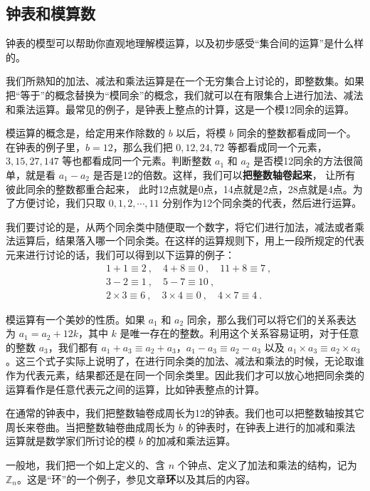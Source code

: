\subsection{钟表和模算数}

钟表的模型可以帮助你直观地理解模运算，以及初步感受“集合间的运算”是什么样的。

我们所熟知的加法、减法和乘法运算是在一个无穷集合上讨论的，即整数集。如果把“等于”的概念替换为“模同余”的概念，我们就可以在有限集合上进行加法、减法和乘法运算。最常见的例子，是钟表上整点的计算，这是一个模12同余的运算。

模运算的概念是，给定用来作除数的 $b$ 以后，将模 $b$ 同余的整数都看成同一个。在钟表的例子里，$b=12$，那么我们把 $0,12,24,72$ 等都看成同一个元素，$3,15,27,147$ 等也都看成同一个元素。判断整数 $a_1$ 和 $a_2$ 是否模12同余的方法很简单，就是看 $a_1-a_2$ 是否是12的倍数。这样，我们可以\textbf{把整数轴卷起来}， 让所有彼此同余的整数都重合起来， 此时12点就是0点，14点就是2点，28点就是4点。为了方便讨论，我们只取 $0,1,2,\cdots,11$ 分别作为12个同余类的代表，然后进行运算。

我们要讨论的是，从两个同余类中随便取一个数字，将它们进行加法，减法或者乘法运算后，结果落入哪一个同余类。在这样的运算规则下，用上一段所规定的代表元来进行讨论的话，我们可以得到以下运算的例子：
\begin{equation}
\begin{aligned}
&1+1\equiv 2~, \quad 4+8\equiv 0~, \quad 11+8\equiv 7~, \\
&3-2\equiv 1~, \quad 5-7\equiv 10~, \\
&2\times 3\equiv 6~, \quad 3\times 4\equiv 0~, \quad 4\times 7\equiv 4~.
\end{aligned}
\end{equation}


模运算有一个美妙的性质。如果 $a_1$ 和 $a_2$ 同余，那么我们可以将它们的关系表达为 $a_1=a_2+12k$，其中 $k$ 是唯一存在的整数。利用这个关系容易证明，对于任意的整数 $a_3$，我们都有 $a_1+a_3\equiv a_2+a_3$，$a_1-a_3\equiv a_2-a_3$ 以及 $a_1\times a_3\equiv a_2\times a_3$。这三个式子实际上说明了，在进行同余类的加法、减法和乘法的时候，无论取谁作为代表元素，结果都还是在同一个同余类里。因此我们才可以放心地把同余类的运算看作是任意代表元之间的运算，比如钟表整点的计算。

在通常的钟表中，我们把整数轴卷成周长为12的钟表。我们也可以把整数轴按其它周长来卷曲。当把整数轴卷曲成周长为 $b$ 的钟表时，在钟表上进行的加减和乘法运算就是数学家们所讨论的模 $b$ 的加减和乘法运算。

一般地，我们把一个如上定义的、含 $n$ 个钟点、定义了加法和乘法的结构，记为 $\mathbb{Z}_n$。这是“环”的一个例子，参见文章\textbf{环}以及其后的内容。

